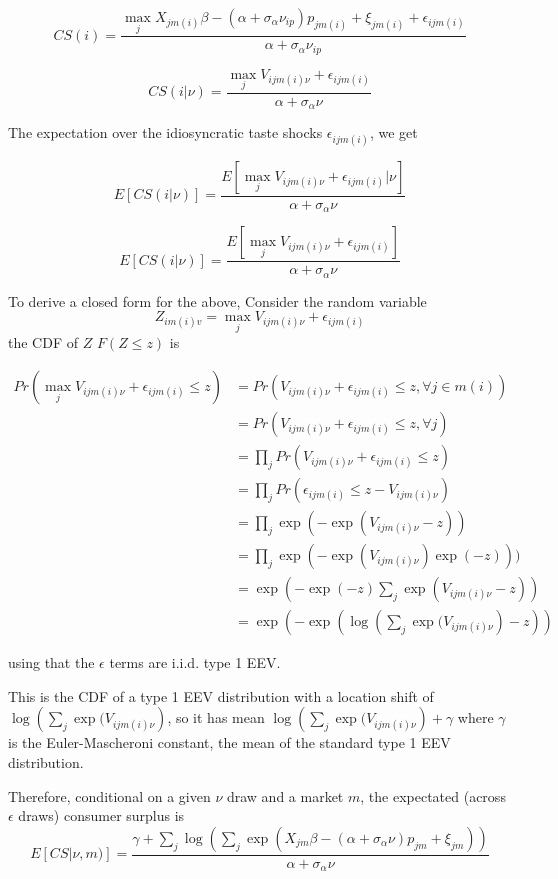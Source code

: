\documentclass{article}
\begin{document}
\begin{enumerate}
\begin{enumerate}
\begin{answer}
$$CS(i)=\frac{\max_{j}X_{jm(i)}\beta - (\alpha + \sigma_\alpha \nu_{ip})p_{jm(i)} + \xi_{jm(i)} + \epsilon_{ijm(i)}}{\alpha + \sigma_{\alpha} \nu _{ip}}$$

$$CS(i|\nu)=\frac{ \max_jV_{ijm(i)\nu}+ \epsilon_{ijm(i)}}{\alpha + \sigma_{\alpha} \nu}$$

The expectation over the  idiosyncratic taste shocks $\epsilon_{ijm(i)}$, we get 

$$E[CS(i|\nu)]=\frac{E[\max_jV_{ijm(i)\nu}+ \epsilon_{ijm(i)}|\nu ]}{\alpha + \sigma_{\alpha} \nu}$$

$$E[CS(i|\nu)]=\frac{E[\max_jV_{ijm(i)\nu}+ \epsilon_{ijm(i)} ]}{\alpha + \sigma_{\alpha} \nu}$$

To derive a closed form for the above, 
Consider the random variable 
$$Z_{im(i)v} = \max_jV_{ijm(i)\nu}+ \epsilon_{ijm(i)}$$
the CDF of $Z$ $F(Z\leq z)$ is 

\begin{align*}
    Pr(\max_jV_{ijm(i)\nu}+ \epsilon_{ijm(i)} \leq z) &= Pr(V_{ijm(i)\nu}+ \epsilon_{ijm(i)} \leq z, \forall j \in m(i))\\
    &=Pr(V_{ijm(i)\nu}+ \epsilon_{ijm(i)} \leq z, \forall j )\\
    &=\prod _{j}Pr(V_{ijm(i)\nu}+ \epsilon_{ijm(i)} \leq z)\\
    &=\prod _{j}Pr(\epsilon_{ijm(i)} \leq z - V_{ijm(i)\nu})\\
    &=\prod _{j} \exp(-\exp(V_{ijm(i)\nu}-z)) \\
    &=\prod _{j} \exp(-\exp(V_{ijm(i)\nu})\exp(-z)))\\
    &= \exp(-\exp(-z)\sum_j\exp(V_{ijm(i)\nu}-z))\\
    &= \exp(-\exp(  \log \left( \sum_j\exp(V_{ijm(i)\nu} \right)-z))
\end{align*}

using that the $\epsilon$ terms are i.i.d. type 1 EEV. 

This is the CDF of a type 1 EEV  distribution with a location shift of $\log \left( \sum_j\exp(V_{ijm(i)\nu} \right)$, so it has mean $\log \left( \sum_j\exp(V_{ijm(i)\nu} \right) + \gamma$ where $\gamma$ is the Euler-Mascheroni constant, the mean of the standard type 1 EEV distribution. 

Therefore, conditional on a given $\nu$ draw and a market $m$, the expectated (across $\epsilon$ draws) consumer surplus is 
$$E[CS|\nu,m)]=\frac{\gamma + \sum_j \log \left( \sum_j \exp \left(X_{jm}\beta - (\alpha + \sigma_\alpha \nu)p_{jm} + \xi_{jm}\right)\right)}{{\alpha + \sigma_{\alpha} \nu}}$$


\end{answer}
\end{enumerate}
\end{enumerate}
\end{document}
